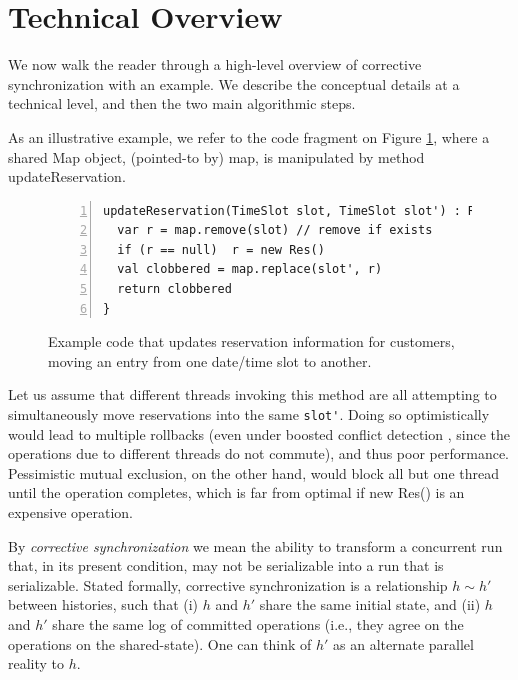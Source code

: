 \section{Technical Overview}

We now walk the reader through a high-level overview of corrective synchronization with an example. We  describe the conceptual details at a technical level, and then the two main algorithmic steps.

%
As an illustrative example, we refer to the code fragment
on Figure \ref{Fi:introMotivating},
where a shared {\sf Map} object, (pointed-to by) {\sf map}, is manipulated by method {\sf updateReservation}.
%
\begin{figure}[t]
\centering
	\begin{lstlisting}[numbers=left,xleftmargin=15pt]
updateReservation(TimeSlot slot, TimeSlot slot') : Reservation = {
  var r = map.remove(slot) // remove if exists
  if (r == null)  r = new Res()
  val clobbered = map.replace(slot', r)
  return clobbered
}
	\end{lstlisting}
        \caption{\label{Fi:introMotivating} Example code that updates reservation information for customers, moving an entry from one date/time slot to another.}
\end{figure}
%
Let us assume that different threads invoking this method
are all attempting to simultaneously move reservations into the same \lstinline$slot'$.
Doing so optimistically would lead to multiple rollbacks (even under boosted conflict detection \cite{ppopp08}, since the operations due to different threads do not commute), and thus poor performance. Pessimistic mutual exclusion, on the other hand, would block all but one thread until the operation completes, which is far from optimal if {\sf new Res()} is an expensive operation.



\newcommand\hrel{\sim}
%
By \emph{corrective synchronization} we mean the ability to transform a concurrent run that, in its present condition, may not be serializable into a run that is serializable. Stated formally, corrective synchronization is a relationship $h \hrel h'$ between histories, such that (i) $h$ and $h'$ share the same initial state, and (ii) $h$ and $h'$ share the same log of committed operations (i.e., they agree on the operations on the shared-state). One can think of $h'$ as an alternate parallel reality to $h$.

